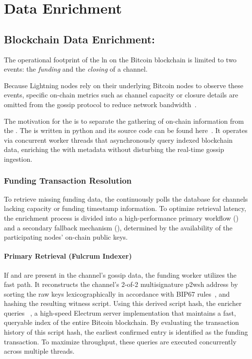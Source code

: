 \section{Data Enrichment}

\subsection{Blockchain Data Enrichment: }
\label{sec:chain-enricher}

The operational footprint of the \gls{ln} on the Bitcoin blockchain is limited to two events: 
the \textit{funding} and the \textit{closing} of a channel. 

Because Lightning nodes rely on their underlying Bitcoin nodes to observe these events, 
specific on-chain metrics such as channel capacity or closure details
are omitted from the gossip protocol to reduce network bandwidth~\cite{antonopoulos_mastering_2021}.

The motivation for the  is to separate the gathering of on-chain information from the . 
The  is written in python and its source code can be found here~\cite{kraus_chainenricher_2026}. 
It operates via concurrent worker threads that asynchronously query indexed blockchain data, 
enriching the  with metadata without disturbing the real-time gossip ingestion.

\subsubsection{Funding Transaction Resolution}
To retrieve missing funding data, the  continuously polls 
the database for channels lacking capacity or funding timestamp information. 
To optimize retrieval latency, the enrichment process is divided into a high-performance primary workflow () 
and a secondary fallback mechanism (), 
determined by the availability of the participating nodes' on-chain public keys.

\paragraph{Primary Retrieval (Fulcrum Indexer)}
If  and  are present in the channel's gossip data, 
the funding worker utilizes the fast path. 
It reconstructs the channel's 2-of-2 multisignature \gls{p2wsh} address by sorting the raw keys lexicographically 
in accordance with BIP67 rules~\cite{kerin_bip_2015}, and hashing the resulting witness script. 
Using this derived script hash, the enricher queries ~\cite{culianu_cculianu_2026}, 
a high-speed Electrum server implementation that maintains a fast, queryable index of the entire Bitcoin blockchain. 
By evaluating the transaction history of this script hash, the earliest confirmed entry is identified as the funding transaction. 
To maximize throughput, these queries are executed concurrently across multiple threads.


